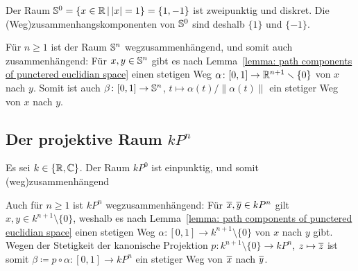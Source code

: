 Der Raum $\mathbb{S}^0 = \{x \in \mathbb{R} \,|\, |x| = 1\} = \{1, -1\}$ ist zweipunktig und diskret.
Die (Weg)zu\-sammen\-hangs\-kom\-po\-nen\-ten von $\mathbb{S}^0$ sind deshalb $\{1\}$ und $\{-1\}$.

Für $n \geq 1$ ist der Raum $\mathbb{S}^n$ wegzusammenhängend, und somit auch zusammenhängend:
Für $x, y \in \mathbb{S}^n$ gibt es nach Lemma~\ref{lemma: path components of punctered euclidian space} einen stetigen Weg $\alpha \colon [0,1] \to \mathbb{R}^{n+1} \smallsetminus \{0\}$ von $x$ nach $y$.
Somit ist auch $\beta \colon [0,1] \to \mathbb{S}^n$, $t \mapsto \alpha(t) / \|\alpha(t)\|$ ein stetiger Weg von $x$ nach $y$.





\subsection{Der projektive Raum \texorpdfstring{$kP^n$}{kPn}}

Es sei $k \in \{\mathbb{R}, \mathbb{C}\}$.
Der Raum $kP^0$ ist einpunktig, und somit (weg)zusammenhängend

Auch für $n \geq 1$ ist $kP^n$ wegzusammenhängend:
Für $\overline{x}, \overline{y} \in kP^n$ gilt $x, y \in k^{n+1} \setminus \{0\}$, weshalb es nach Lemma~\ref{lemma: path components of punctered euclidian space} einen stetigen Weg $\alpha \colon [0,1] \to k^{n+1} \setminus \{0\}$ von $x$ nach $y$ gibt.
Wegen der Stetigkeit der kanonische Projektion $p \colon k^{n+1} \setminus \{0\} \to kP^n$, $z \mapsto \overline{z}$ ist somit $\beta \coloneqq p \circ \alpha \colon [0,1] \to kP^n$ ein stetiger Weg von $\overline{x}$ nach $\overline{y}$.











